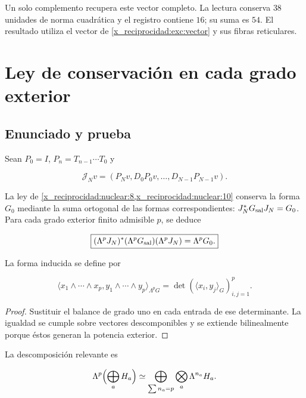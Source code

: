 Un solo complemento recupera este vector completo.
La lectura conserva \(38\) unidades de norma cuadrática y el
registro contiene \(16\); su suma es \(54\).
El resultado utiliza el vector de \eqref{x_reciprocidad:exc:vector} y sus fibras
reticulares.

\section{Ley de conservación en cada grado exterior}

\subsection{Enunciado y prueba}

Sean \(P_0=I\), \(P_n=T_{n-1}\cdots T_0\) y



\[
\mathcal J_Nv=(P_Nv,D_0P_0v,\ldots,D_{N-1}P_{N-1}v).
\]



La ley de \cref{x_reciprocidad:nuclear:8,x_reciprocidad:nuclear:10} conserva la forma \(G_0\)
mediante la suma ortogonal de las formas correspondientes:
\(\mathcal J_N^*G_{\rm sal}\mathcal J_N=G_0\).
Para cada grado exterior finito admisible \(p\), se deduce



\begin{equation}
\boxed{
(\Lambda^p\mathcal J_N)^*(\Lambda^pG_{\rm sal})
(\Lambda^p\mathcal J_N)=\Lambda^pG_0.
}
\label{x_reciprocidad:nuc11:eq:20}
\end{equation}



La forma inducida se define por



\[
\langle x_1\wedge\cdots\wedge x_p,
y_1\wedge\cdots\wedge y_p\rangle_{\Lambda^pG}
=\det(\langle x_i,y_j\rangle_G)_{i,j=1}^p.
\]



\begin{proof}
Sustituir el balance de grado uno en cada entrada de ese determinante. La igualdad se cumple sobre vectores descomponibles y se extiende bilinealmente porque éstos generan la potencia exterior.
\end{proof}

La descomposición relevante es



\[
\Lambda^p\Bigl(\bigoplus_aH_a\Bigr)
\simeq\bigoplus_{\sum n_a=p}\bigotimes_a\Lambda^{n_a}H_a.
\]



